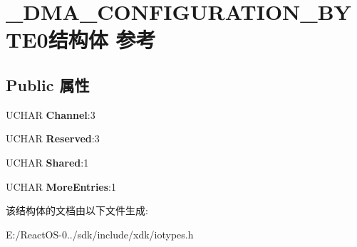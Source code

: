 \hypertarget{struct___d_m_a___c_o_n_f_i_g_u_r_a_t_i_o_n___b_y_t_e0}{}\section{\+\_\+\+D\+M\+A\+\_\+\+C\+O\+N\+F\+I\+G\+U\+R\+A\+T\+I\+O\+N\+\_\+\+B\+Y\+T\+E0结构体 参考}
\label{struct___d_m_a___c_o_n_f_i_g_u_r_a_t_i_o_n___b_y_t_e0}
\subsection*{Public 属性}
\begin{DoxyCompactItemize}
\item 
\mbox{\label{struct___d_m_a___c_o_n_f_i_g_u_r_a_t_i_o_n___b_y_t_e0_a197ba93b71c7924843782842b15d25bf}} 
U\+C\+H\+AR {\bfseries Channel}\+:3
\item 
\mbox{\label{struct___d_m_a___c_o_n_f_i_g_u_r_a_t_i_o_n___b_y_t_e0_ae97818ff334d7490b41d2118faa03695}} 
U\+C\+H\+AR {\bfseries Reserved}\+:3
\item 
\mbox{\label{struct___d_m_a___c_o_n_f_i_g_u_r_a_t_i_o_n___b_y_t_e0_a2b377c84ae075156445076fae3aeb6ed}} 
U\+C\+H\+AR {\bfseries Shared}\+:1
\item 
\mbox{\label{struct___d_m_a___c_o_n_f_i_g_u_r_a_t_i_o_n___b_y_t_e0_a079e91f9da0f5d0d67610c87cfa9e69e}} 
U\+C\+H\+AR {\bfseries More\+Entries}\+:1
\end{DoxyCompactItemize}


该结构体的文档由以下文件生成\+:\begin{DoxyCompactItemize}
\item 
E\+:/\+React\+O\+S-\/0../sdk/include/xdk/iotypes.\+h\end{DoxyCompactItemize}
